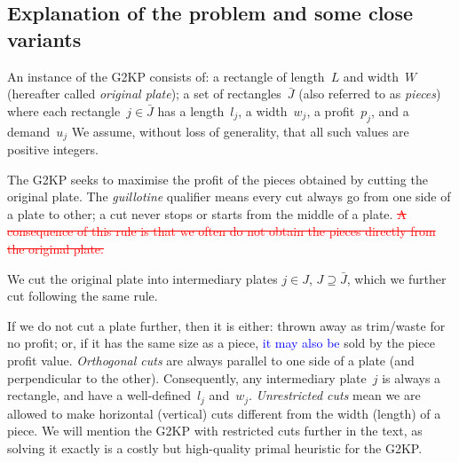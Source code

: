 \documentclass[smallextended]{svjour3}       %
\newif\iffinalversion
\newcommand{\newtext}[1]{\iffinalversion%
#1%
\else%
\textcolor{blue}{#1}%
\fi%
}
\newcommand{\oldtext}[1]{\iffinalversion%
#1%
\else%
\textcolor{red}{\sout{#1}}%
\fi%
}
\begin{document}
\subsection{Explanation of the problem and some close variants}

An instance of the G2KP consists of: a rectangle of length~\(L\) and width~\(W\) (hereafter called \emph{original plate}); a set of rectangles~\(\bar{J}\) (also referred to as \emph{pieces}) where each rectangle~\(j \in \bar{J}\) has a length~\(l_j\), a width~\(w_j\), a profit~\(p_j\), and a demand~\(u_j\)
We assume, without loss of generality, that all such values are positive integers.

The G2KP seeks to maximise the profit of the pieces obtained by cutting the original plate.
The \emph{guillotine} qualifier means every cut always go from one side of a plate to other; a cut never stops or starts from the middle of a plate.
\oldtext{A consequence of this rule is that we often do not obtain the pieces directly from the original plate.}
We cut the original plate into intermediary plates \(j \in J\), \(J \supseteq \bar{J}\), which we further cut following the same rule.

If we do not cut a plate further, then it is either: thrown away as trim/waste for no profit; or, if it has the same size as a piece, \newtext{it may also be} sold by the piece profit value.
\emph{Orthogonal cuts} are always parallel to one side of a plate (and perpendicular to the other).
Consequently, any intermediary plate~\(j\) is always a rectangle, and have a well-defined~\(l_j\) and~\(w_j\).
\emph{Unrestricted cuts} mean we are allowed to make horizontal (vertical) cuts different from the width (length) of a piece.
We will mention the G2KP with restricted cuts further in the text, as solving it exactly is a costly but high-quality primal heuristic for the G2KP.
\end{document}
